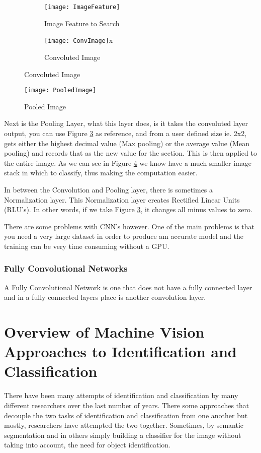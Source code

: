 \begin{figure}
    \caption{Image Convolution}  
    \begin{subfigure}[b]{0.4\textwidth}
          \texttt{[image: ImageFeature]}
          \caption{Image Feature to Search}
          \label{fig:feature}
      \end{subfigure}
      \begin{subfigure}[b]{0.4\textwidth}
           \texttt{[image: ConvImage]}x
           \caption{Convoluted Image}
           \label{fig:convoluted}
      \end{subfigure}
\end{figure}
\begin{figure}
    \texttt{[image: PooledImage]}
    \caption{Pooled Image}
    \label{fig:pooled}
\end{figure}
Next is the Pooling Layer, what this layer does, is it takes the convoluted
layer output, you can use Figure \ref{fig:convoluted} as reference, and from a
user defined size ie. 2x2, gets either the highest decimal value (Max pooling)
or the average value (Mean pooling) and records that as the new value for the
section. This is then applied to the entire image. As we can see in Figure
\ref{fig:pooled} we know have a much smaller image stack in which to classify,
thus making the computation easier.

In between the Convolution and Pooling layer, there is sometimes a Normalization
layer. This Normalization layer creates Rectified Linear Units (RLU's). In other
words, if we take Figure \ref{fig:convoluted}, it changes all minus values to
zero.

There are some problems with CNN's however. One of the main problems is that you
need a very large dataset in order to produce am accurate model and the training
can be very time consuming without a GPU.


\subsubsection{Fully Convolutional Networks}
A Fully Convolutional Network is one that does not have a fully connected layer
and in a fully connected layers place is another convolution layer.

\section{Overview of Machine Vision Approaches to Identification and Classification}
There have been many attempts of identification and classification by many
different researchers over the last number of years. There some approaches that
decouple the two tasks of identification and classification from one another but
mostly, researchers have attempted the two together. Sometimes, by semantic
segmentation and in others simply building a classifier for the image without
taking into account, the need for object identification.

